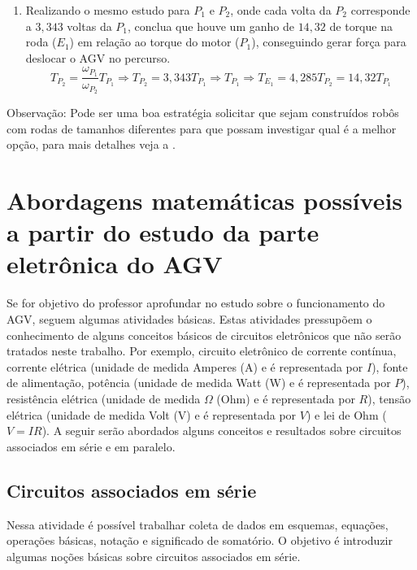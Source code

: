 \documentclass{textolivre-html}
\begin{document}
\begin{enumerate}
\item Realizando o mesmo estudo para $P_1$ e $P_2$, onde cada volta da $P_2$ corresponde a $3,343$ voltas da $P_1$, conclua que houve um ganho de $14,32$ de torque na roda ($E_1$) em relação ao torque do motor ($P_1$), conseguindo gerar força para deslocar o AGV no percurso.
\begin{equation*}
T_{P_2} = \frac{\omega_{P_1}}{\omega_{P_2}} T_{P_1} \Rightarrow T_{P_2} = 3,343 T_{P_1} \Rightarrow T_{P_1} \Rightarrow T_{E_1} = 4,285 T_{P_2} = 14,32 T_{P_1}
\end{equation*}

\end{enumerate}


Observação: Pode ser uma boa estratégia solicitar que sejam construídos robôs
com rodas de tamanhos diferentes para que possam investigar qual é a melhor
opção, para mais detalhes veja a .



\section{Abordagens matemáticas possíveis a partir do estudo da parte eletrônica do AGV}\label{sec-abordagens}
Se for objetivo do professor aprofundar no estudo sobre o funcionamento do AGV,
seguem algumas atividades básicas. Estas atividades pressupõem o conhecimento
de alguns conceitos básicos de circuitos eletrônicos que não serão tratados
neste trabalho. Por exemplo, circuito eletrônico de corrente contínua, corrente
elétrica (unidade de medida Amperes (A) e é representada por $I$), fonte de
alimentação, potência (unidade de medida Watt (W) e é representada por $P$),
resistência elétrica (unidade de medida $\Omega$ (Ohm) e é representada por $R$), tensão
elétrica (unidade de medida Volt (V) e é representada por $V$) e lei de Ohm ($V = IR$). 
A seguir serão abordados alguns conceitos e resultados sobre circuitos
associados em série e em paralelo.


\subsection{Circuitos associados em série}\label{sec-circuitos}
Nessa atividade é possível trabalhar coleta de dados em esquemas, equações,
operações básicas, notação e significado de somatório. O objetivo é introduzir
algumas noções básicas sobre circuitos associados em série.
\end{document}

